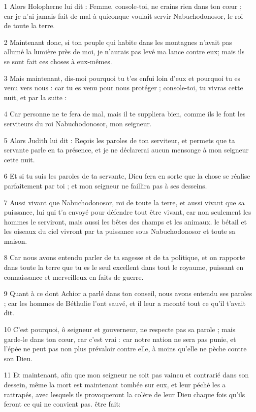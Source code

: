 \par 1 Alors Holopherne lui dit : Femme, console-toi, ne crains rien dans ton cœur ; car je n'ai jamais fait de mal à quiconque voulait servir Nabuchodonosor, le roi de toute la terre.
\par 2 Maintenant donc, si ton peuple qui habite dans les montagnes n'avait pas allumé la lumière près de moi, je n'aurais pas levé ma lance contre eux; mais ils se sont fait ces choses à eux-mêmes.
\par 3 Mais maintenant, dis-moi pourquoi tu t'es enfui loin d'eux et pourquoi tu es venu vers nous : car tu es venu pour nous protéger ; console-toi, tu vivras cette nuit, et par la suite :
\par 4 Car personne ne te fera de mal, mais il te suppliera bien, comme ils le font les serviteurs du roi Nabuchodonosor, mon seigneur.
\par 5 Alors Judith lui dit : Reçois les paroles de ton serviteur, et permets que ta servante parle en ta présence, et je ne déclarerai aucun mensonge à mon seigneur cette nuit.
\par 6 Et si tu suis les paroles de ta servante, Dieu fera en sorte que la chose se réalise parfaitement par toi ; et mon seigneur ne faillira pas à ses desseins.
\par 7 Aussi vivant que Nabuchodonosor, roi de toute la terre, et aussi vivant que sa puissance, lui qui t'a envoyé pour défendre tout être vivant, car non seulement les hommes le serviront, mais aussi les bêtes des champs et les animaux. le bétail et les oiseaux du ciel vivront par ta puissance sous Nabuchodonosor et toute sa maison.
\par 8 Car nous avons entendu parler de ta sagesse et de ta politique, et on rapporte dans toute la terre que tu es le seul excellent dans tout le royaume, puissant en connaissance et merveilleux en faits de guerre.
\par 9 Quant à ce dont Achior a parlé dans ton conseil, nous avons entendu ses paroles ; car les hommes de Béthulie l'ont sauvé, et il leur a raconté tout ce qu'il t'avait dit.
\par 10 C'est pourquoi, ô seigneur et gouverneur, ne respecte pas sa parole ; mais garde-le dans ton cœur, car c'est vrai : car notre nation ne sera pas punie, et l'épée ne peut pas non plus prévaloir contre elle, à moins qu'elle ne pèche contre son Dieu.
\par 11 Et maintenant, afin que mon seigneur ne soit pas vaincu et contrarié dans son dessein, même la mort est maintenant tombée sur eux, et leur péché les a rattrapés, avec lesquels ils provoqueront la colère de leur Dieu chaque fois qu'ils feront ce qui ne convient pas. être fait:
